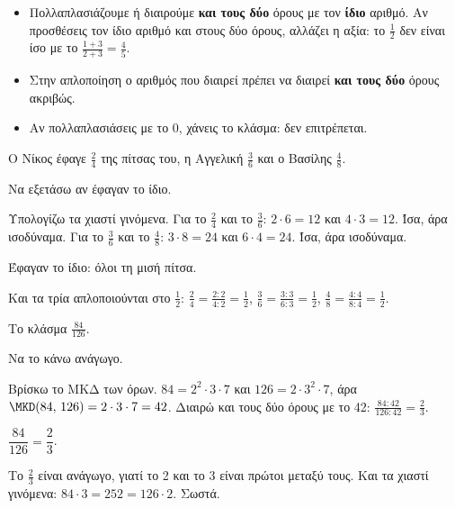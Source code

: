 \begin{prosoxi}
\begin{itemize}[leftmargin=1.2em,itemsep=0.3ex,topsep=2pt]
\item Πολλαπλασιάζουμε ή διαιρούμε \textbf{και τους δύο} όρους με τον \textbf{ίδιο} αριθμό. Αν προσθέσεις τον ίδιο αριθμό και στους δύο όρους, αλλάζει η αξία: το $\frac{1}{2}$ δεν είναι ίσο με το $\frac{1+3}{2+3}=\frac{4}{5}$.
\item Στην απλοποίηση ο αριθμός που διαιρεί πρέπει να διαιρεί \textbf{και τους δύο} όρους ακριβώς.
\item Αν πολλαπλασιάσεις με το 0, χάνεις το κλάσμα: δεν επιτρέπεται.
\end{itemize}
\end{prosoxi}


\tixero Ο Νίκος έφαγε $\frac{2}{4}$ της πίτσας του, η Αγγελική $\frac{3}{6}$ και ο Βασίλης $\frac{4}{8}$.\par
\tithelo Να εξετάσω αν έφαγαν το ίδιο.\par
\possindeo Υπολογίζω τα χιαστί γινόμενα. Για το $\frac{2}{4}$ και το $\frac{3}{6}$: $2\cdot 6=12$ και $4\cdot 3=12$. Ίσα, άρα ισοδύναμα. Για το $\frac{3}{6}$ και το $\frac{4}{8}$: $3\cdot 8=24$ και $6\cdot 4=24$. Ίσα, άρα ισοδύναμα.\par
\apantisi Έφαγαν το ίδιο: όλοι τη μισή πίτσα.\par
\elegxos Και τα τρία απλοποιούνται στο $\frac{1}{2}$: $\frac{2}{4}=\frac{2:2}{4:2}=\frac{1}{2}$, $\frac{3}{6}=\frac{3:3}{6:3}=\frac{1}{2}$, $\frac{4}{8}=\frac{4:4}{8:4}=\frac{1}{2}$.

\tixero Το κλάσμα $\frac{84}{126}$.\par
\tithelo Να το κάνω ανάγωγο.\par
\possindeo Βρίσκω το ΜΚΔ των όρων. $84=2^2\cdot 3\cdot 7$ και $126=2\cdot 3^2\cdot 7$, άρα $\MKD(84,\,126)=2\cdot 3\cdot 7=42$. Διαιρώ και τους δύο όρους με το 42: $\frac{84:42}{126:42}=\frac{2}{3}$.\par
\apantisi $\dfrac{84}{126}=\dfrac{2}{3}$.\par
\elegxos Το $\frac{2}{3}$ είναι ανάγωγο, γιατί το 2 και το 3 είναι πρώτοι μεταξύ τους. Και τα χιαστί γινόμενα: $84\cdot 3=252=126\cdot 2$. Σωστά.

